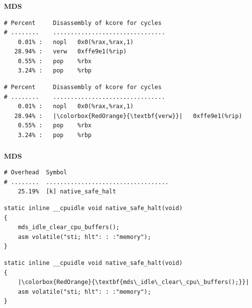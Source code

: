 \documentclass[usenames,dvipsnames, 18pt, compress, aspectratio=169]{beamer}
\begin{document}
\begin{frame}[fragile]{}
    \frametitle{}
    \begin{center}
    \textbf{MDS}

    \vspace{1.0cm}
    \begin{overprint}
        \begin{verbatim}
# Percent     Disassembly of kcore for cycles
# ........    ................................
    0.01% :   nopl   0x0(%rax,%rax,1)
   28.94% :   verw   0xffe9e1(%rip)
    0.55% :   pop    %rbx
    3.24% :   pop    %rbp
        \end{verbatim}

        \begin{verbatim}
# Percent     Disassembly of kcore for cycles
# ........    ................................
    0.01% :   nopl   0x0(%rax,%rax,1)
   28.94% :   |\colorbox{RedOrange}{\textbf{verw}}|   0xffe9e1(%rip)
    0.55% :   pop    %rbx
    3.24% :   pop    %rbp
        \end{verbatim}


    \end{overprint}
    \end{center}
\end{frame}

\begin{frame}[fragile]{}
    \frametitle{}
    \begin{center}
    \textbf{MDS}

    \vspace{1.0cm}
    \begin{overprint}
        \begin{verbatim}
# Overhead  Symbol                                        
# ........  ...................................
    25.19%  [k] native_safe_halt
        \end{verbatim}

        \begin{verbatim}
static inline __cpuidle void native_safe_halt(void)
{
	mds_idle_clear_cpu_buffers();
	asm volatile("sti; hlt": : :"memory");
}

        \end{verbatim}

        \begin{verbatim}
static inline __cpuidle void native_safe_halt(void)
{
	|\colorbox{RedOrange}{\textbf{mds\_idle\_clear\_cpu\_buffers();}}|
	asm volatile("sti; hlt": : :"memory");
}

        \end{verbatim}


    \end{overprint}
    \end{center}
\end{frame}
\end{document}
